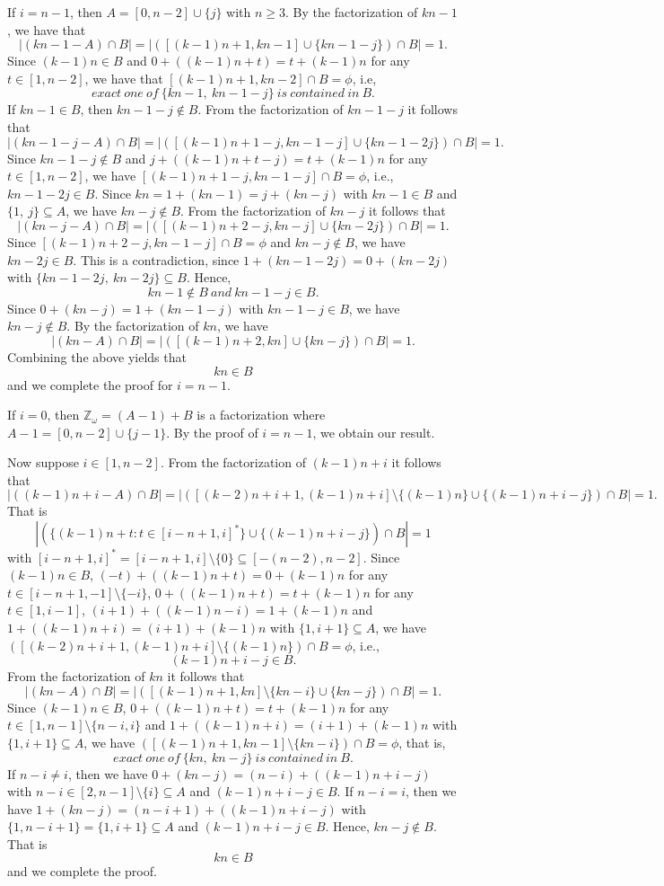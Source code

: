 \documentclass[preprint]{elsarticle}
\begin{document}
If $i=n-1$, then $A=[0,n-2]\cup \{j\}$ with $n\geq 3$.
By the factorization of $kn-1$, we have that $$|(kn-1-A)\cap B|=|([(k-1)n+1,kn-1]\cup \{kn-1-j\})\cap B|=1.$$
Since $(k-1)n\in B$ and $0+((k-1)n+t)=t+(k-1)n$ for any $t\in [1,n-2]$, we have that $[(k-1)n+1,kn-2]\cap B=\phi$, i.e, $$exact \ one \ of\ \{kn-1,\ kn-1-j\} \ is \ contained \ in \ B.$$
If $kn-1\in B$, then $kn-1-j\not\in B$.
From the factorization of $kn-1-j$ it follows that $$|(kn-1-j-A)\cap B|=|([(k-1)n+1-j,kn-1-j]\cup \{kn-1-2j\})\cap B|=1.$$
Since $kn-1-j\not\in B$ and $j+((k-1)n+t-j)=t+(k-1)n$ for any $t\in [1,n-2]$, we have $[(k-1)n+1-j,kn-1-j]\cap B=\phi$, i.e., $kn-1-2j\in B$.
Since $kn=1+(kn-1)=j+(kn-j)$ with $kn-1\in B$ and $\{1,\ j\}\subseteq A$,
we have $kn-j\not\in B$.
From the factorization of $kn-j$ it follows that $$|(kn-j-A)\cap B|=|([(k-1)n+2-j,kn-j]\cup \{kn-2j\})\cap B|=1.$$
Since $[(k-1)n+2-j,kn-1-j]\cap B=\phi$ and $kn-j\not\in B$, we have $kn-2j\in B$.
This is a contradiction, since $1+(kn-1-2j)=0+(kn-2j)$ with $\{kn-1-2j,\ kn-2j\}\subseteq B$.
Hence, $$kn-1\not\in B\ and \ kn-1-j\in B.$$
Since $0+(kn-j)=1+(kn-1-j)$ with $kn-1-j\in B$, we have $kn-j\not\in B$.
By the factorization of $kn$, we have $$|(kn-A)\cap B|=|([(k-1)n+2,kn]\cup \{kn-j\})\cap B|=1.$$
Combining the above yields that $$kn\in B$$ and we complete the proof for $i=n-1$.

If $i=0$, then $\mathbb{Z}_{\omega}=(A-1)+B$ is a factorization where $A-1=[0,n-2]\cup \{j-1\}$.
By the proof of $i=n-1$, we obtain our result.



Now suppose $i\in [1,n-2]$.
From the factorization of $(k-1)n+i$ it follows that $$|((k-1)n+i-A)\cap B|=|([(k-2)n+i+1,(k-1)n+i]\setminus \{(k-1)n\}\cup \{(k-1)n+i-j\})\cap B|=1.$$
That is $$|(\{(k-1)n+t:t\in [i-n+1,i]^*\}\cup \{(k-1)n+i-j\})\cap B|=1$$
with $[i-n+1,i]^*=[i-n+1,i]\setminus \{0\}\subseteq [-(n-2),n-2]$.
Since $(k-1)n\in B$, $(-t)+((k-1)n+t)=0+(k-1)n$ for any $t\in [i-n+1,-1]\setminus \{-i\}$,
$0+((k-1)n+t)=t+(k-1)n$ for any $t\in [1,i-1]$,
$(i+1)+((k-1)n-i)=1+(k-1)n$
and $1+((k-1)n+i)=(i+1)+(k-1)n$ with $\{1,i+1\}\subseteq A$,
we have $([(k-2)n+i+1,(k-1)n+i]\setminus \{(k-1)n\})\cap B=\phi$, i.e.,
$$(k-1)n+i-j\in B.$$
From the factorization of $kn$ it follows that $$|(kn-A)\cap B|=|([(k-1)n+1,kn]\setminus \{kn-i\}\cup \{kn-j\})\cap B|=1.$$
Since $(k-1)n\in B$, $0+((k-1)n+t)=t+(k-1)n$ for any $t\in [1,n-1]\setminus \{n-i,i\}$
and $1+((k-1)n+i)=(i+1)+(k-1)n$ with $\{1,i+1\}\subseteq A$,
we have $([(k-1)n+1,kn-1]\setminus \{kn-i\})\cap B=\phi$, that is,
$$exact \ one \ of\ \{kn, \ kn-j\} \ is \ contained \ in \ B.$$
If $n-i\neq i$, then we have $0+(kn-j)=(n-i)+((k-1)n+i-j)$ with $n-i\in [2,n-1]\setminus \{i\}\subseteq A$ and $(k-1)n+i-j\in B$.
If $n-i=i$, then we have $1+(kn-j)=(n-i+1)+((k-1)n+i-j)$ with $\{1,n-i+1\}=\{1,i+1\}\subseteq A$ and $(k-1)n+i-j\in B$.
Hence, $kn-j\not\in B$.
That is $$kn\in B$$ and we complete the proof.
\end{document}
